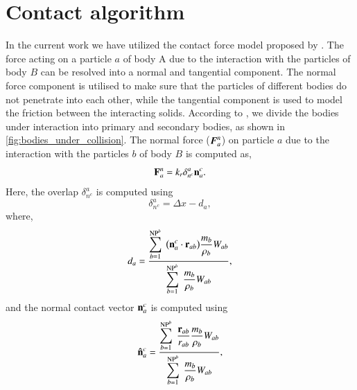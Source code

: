 \section{Contact algorithm}
\label{sec:contact-algorithm}
In the current work we have utilized the contact force model proposed by
\cite{mohseni2021particle}. The force acting on a particle $a$ of body A due
to the interaction with the particles of body $B$ can be resolved into a
normal and tangential component. The normal force component is utilised to
make sure that the particles of different bodies do not penetrate into each
other, while the tangential component is used to model the friction between
the interacting solids. According to \cite{mohseni2021particle}, we divide the
bodies under interaction into primary and secondary bodies, as shown in
\cref{fig:bodies_under_collision}.
The normal force ($\boldsymbol{F}_a^{n}$) on
particle $a$ due to the interaction with the particles $b$ of body $B$ is
computed as,
\begin{equation}
  \label{eq:contact-algorithm-normal}
  \mathbf{F}_a^n = k_r \delta_{n^{c}}^{a} \mathbf{n}_a^{c}.
\end{equation}
Here, the overlap $\delta_{n^{c}}^{a}$ is computed using
\begin{equation}
  \label{eq:csph:cf-overlap}
  \delta_{n^{c}}^{a} = \Delta x - d_a,
\end{equation}
where,
\begin{equation}
  \label{eq:cf-distance-computation}
  d_a = \frac{
    \displaystyle\sum\limits_{b = 1}^{\text{NP}^{b}} \;
    \big( \mathbf{n}_a^{c} \cdot \mathbf{r}_{ab} \big)  \frac{m_b}{\rho_b} W_{ab}}
  {
    \displaystyle\sum\limits_{b = 1}^{\text{NP}^{b}} \;
    \frac{m_b}{\rho_b} W_{ab}},
\end{equation}
and the normal contact vector $\mathbf{n}_a^{c}$ is computed using
\begin{equation}
  \label{eq:cf-normal-vector}
  \mathbf{\hat{n}}_a^{c} = \frac{
    \displaystyle\sum\limits_{b = 1}^{\text{NP}^{b}} \;
    \frac{\mathbf{r}_{ab}}{r_{ab}}  \frac{m_b}{\rho_b} W_{ab}}
  {
    \displaystyle\sum\limits_{b = 1}^{\text{NP}^{b}} \;
    \frac{m_b}{\rho_b} W_{ab}},
\end{equation}
